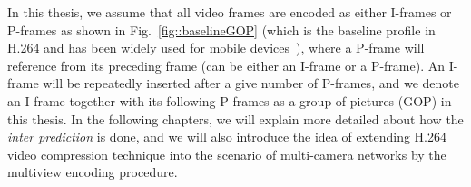 In this thesis, we assume that all video frames are encoded as either I-frames or P-frames as shown in Fig.~\ref{fig::baselineGOP} (which is the baseline profile in H.264 and has been widely used for mobile devices~\cite{h264Recommendation}), where a P-frame will reference from its preceding frame (can be either an I-frame or a P-frame).
An I-frame will be repeatedly inserted after a give number of P-frames, and we denote an I-frame together with its following P-frames as a group of pictures (GOP) in this thesis.
In the following chapters, we will explain more detailed about how the \emph{inter prediction} is done, and we will also introduce the idea of extending H.264 video compression technique into the scenario of multi-camera networks by the multiview encoding procedure.